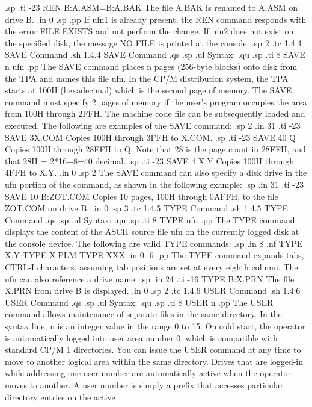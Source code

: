 .sp
.ti -23
REN B:A.ASM=B:A.BAK    The file A.BAK is renamed to A.ASM on drive B.
.in 0
.sp
.pp
If ufn1 is already present, the REN command responds with the
error FILE EXISTS and not perform the change.  If ufn2 does not exist on
the specified disk, the message NO FILE is printed at the console.
.sp 2
.tc         1.4.4  SAVE Command
.sh
1.4.4  SAVE Command
.qs
.sp
.ul
Syntax:
.qu
.sp
.ti 8
SAVE n ufn
.pp
The SAVE command places n pages (256-byte blocks) onto disk from the TPA
and names this file ufn.  In the CP/M distribution system, the TPA starts
at 100H (hexadecimal) which is the second page of memory.  The SAVE command
must specify 2 pages of memory if the user's program occupies the area
from 100H through 2FFH.  The machine code file can be subsequently loaded
and executed.  The following are examples of the SAVE command:
.sp 2
.in 31
.ti -23
SAVE 3X.COM            Copies 100H through 3FFH to X.COM.
.sp
.ti -23
SAVE 40 Q              Copies 100H through 28FFH to Q.  Note that 28 is the
page count in 28FFH, and that 28H = 2*16+8=40 decimal.
.sp
.ti -23
SAVE 4 X.Y             Copies 100H through 4FFH to X.Y.
.in 0
.sp 2
The SAVE command can also specify a disk drive in the ufn portion of the
command, as shown in the following example:
.sp
.in 31
.ti -23
SAVE 10 B:ZOT.COM      Copies 10 pages, 100H through 0AFFH, to the
file ZOT.COM on drive B.
.in 0
.sp 3
.tc         1.4.5  TYPE Command
.sh
1.4.5  TYPE Command
.qs
.sp
.ul
Syntax:
.qu
.sp
.ti 8
TYPE ufn
.pp
The TYPE command displays the content of the ASCII source file ufn on the
currently logged disk at the console device.  The following are valid
TYPE commands:
.sp
.in 8
.nf
TYPE X.Y
TYPE X.PLM
TYPE XXX
.in 0
.fi
.pp
The TYPE command expands tabs, CTRL-I characters, assuming tab positions are
set at every eighth column.  The ufn can also reference a drive name.
.sp
.in 24
.ti -16
TYPE B:X.PRN    The file X.PRN from drive B is displayed.
.in 0
.sp 2
.tc         1.4.6  USER Command
.sh
1.4.6  USER Command
.qs
.sp
.ul
Syntax:
.qu
.sp
.ti 8
USER n
.pp
The USER command allows maintenance of separate files in the same 
directory.  In the syntax line, n is an integer value in the range 0 to
15.  On cold start, the operator is automatically logged into user
area number 0, which is
compatible with standard CP/M 1 directories.  You can issue the
USER command at any time to move to another logical area within the same
directory.  Drives that are logged-in while addressing one user number are
automatically active when the operator moves to another.  A user number is
simply a prefix that accesses particular directory entries on the active
